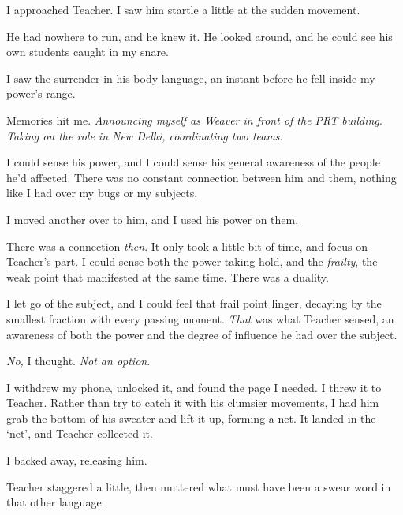 I approached Teacher.  I saw him startle a little at the sudden movement.



He had nowhere to run, and he knew it.  He looked around, and he could see his own students caught in my snare.



I saw the surrender in his body language, an instant before he fell inside my power's range.



Memories hit me. \emph{ Announcing myself as Weaver in front of the PRT building}.  \emph{Taking on the role in New Delhi, coordinating two teams}.



I could sense his power, and I could sense his general awareness of the people he'd affected.  There was no constant connection between him and them, nothing like I had over my bugs or my subjects.



I moved another over to him, and I used his power on them.



There was a connection \emph{then}.  It only took a little bit of time, and focus on Teacher's part.  I could sense both the power taking hold, and the \emph{frailty}, the weak point that manifested at the same time.  There was a duality.



I let go of the subject, and I could feel that frail point linger, decaying by the smallest fraction with every passing moment.  \emph{That} was what Teacher sensed, an awareness of both the power and the degree of influence he had over the subject.



\emph{No, }I thought.  \emph{Not an option}.



I withdrew my phone, unlocked it, and found the page I needed.  I threw it to Teacher.  Rather than try to catch it with his clumsier movements, I had him grab the bottom of his sweater and lift it up, forming a net.  It landed in the `net', and Teacher collected it.



I backed away, releasing him.



Teacher staggered a little, then muttered what must have been a swear word in that other language.



